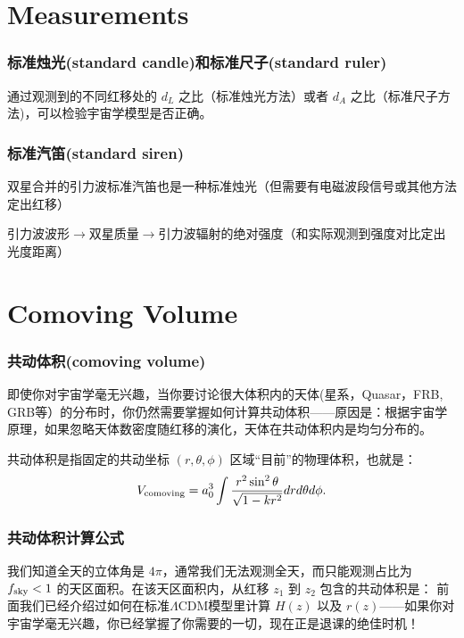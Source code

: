 \documentclass[CJK,13pt]{beamer}
\begin{document}

\section{Measurements}

\begin{frame}
  \frametitle{标准烛光(standard candle)和标准尺子(standard ruler)}

  通过观测到的不同红移处的 $d_L$ 之比（标准烛光方法）或者 $d_A$ 之比（标准尺子方法)，可以检验宇宙学模型是否正确。
\end{frame}


\begin{frame}
  \frametitle{标准汽笛(standard siren)}
  双星合并的引力波标准汽笛也是一种标准烛光（但需要有电磁波段信号或其他方法定出红移）

  

  引力波波形$\rightarrow$双星质量$\rightarrow$引力波辐射的绝对强度（和实际观测到强度对比定出光度距离）
\end{frame}


\section{Comoving Volume}
\begin{frame}
  \frametitle{共动体积(comoving volume)}
  即使你对宇宙学毫无兴趣，当你要讨论很大体积内的天体(星系，Quasar，FRB, GRB等）的分布时，你仍然需要掌握如何计算共动体积——原因是：根据宇宙学原理，如果忽略天体数密度随红移的演化，天体在共动体积内是均匀分布的。

  \skiplines
  
  {\blue 共动体积是指固定的共动坐标 $(r,\theta,\phi)$ 区域“目前”的物理体积}，也就是：
  $$V_{\rm comoving} =  a_0^3\int \frac{r^2\sin^2\theta}{\sqrt{1-kr^2}} dr d\theta d\phi. $$

\end{frame}

\begin{frame}
  \frametitle{共动体积计算公式}
  我们知道全天的立体角是 $4\pi$，通常我们无法观测全天，而只能观测占比为 $f_{\rm sky}<1$ 的天区面积。在该天区面积内，从红移 $z_1$ 到 $z_2$ 包含的共动体积是：
  前面我们已经介绍过如何在标准$\Lambda$CDM模型里计算 $H(z)$ 以及 $r(z)$——如果你对宇宙学毫无兴趣，你已经掌握了你需要的一切，现在正是退课的绝佳时机！
  
\end{frame}

    \ech
\end{document}
